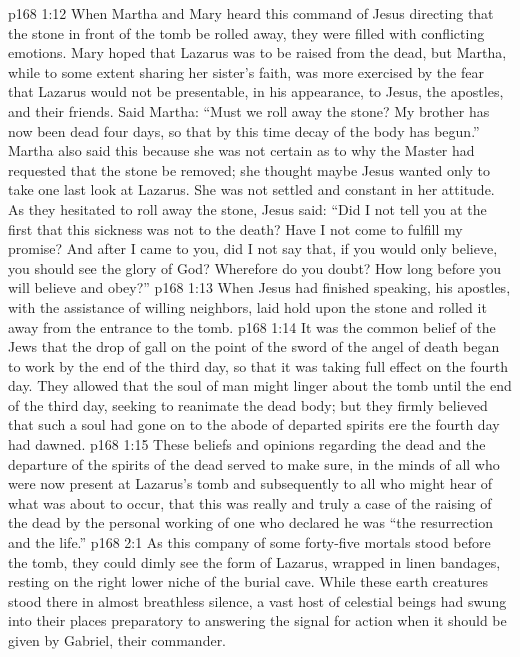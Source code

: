 \vs p168 1:12 When Martha and Mary heard this command of Jesus directing that the stone in front of the tomb be rolled away, they were filled with conflicting emotions. Mary hoped that Lazarus was to be raised from the dead, but Martha, while to some extent sharing her sister’s faith, was more exercised by the fear that Lazarus would not be presentable, in his appearance, to Jesus, the apostles, and their friends. Said Martha: “Must we roll away the stone? My brother has now been dead four days, so that by this time decay of the body has begun.” Martha also said this because she was not certain as to why the Master had requested that the stone be removed; she thought maybe Jesus wanted only to take one last look at Lazarus. She was not settled and constant in her attitude. As they hesitated to roll away the stone, Jesus said: \textcolor{ubdarkred}{“Did I not tell you at the first that this sickness was not to the death? Have I not come to fulfill my promise? And after I came to you, did I not say that, if you would only believe, you should see the glory of God? Wherefore do you doubt? How long before you will believe and obey?”}
\vs p168 1:13 When Jesus had finished speaking, his apostles, with the assistance of willing neighbors, laid hold upon the stone and rolled it away from the entrance to the tomb.
\vs p168 1:14 \pc It was the common belief of the Jews that the drop of gall on the point of the sword of the angel of death began to work by the end of the third day, so that it was taking full effect on the fourth day. They allowed that the soul of man might linger about the tomb until the end of the third day, seeking to reanimate the dead body; but they firmly believed that such a soul had gone on to the abode of departed spirits ere the fourth day had dawned.
\vs p168 1:15 These beliefs and opinions regarding the dead and the departure of the spirits of the dead served to make sure, in the minds of all who were now present at Lazarus’s tomb and subsequently to all who might hear of what was about to occur, that this was really and truly a case of the raising of the dead by the personal working of one who declared he was \textcolor{ubdarkred}{“the resurrection and the life.”}
\vs p168 2:1 As this company of some forty\hyp{}five mortals stood before the tomb, they could dimly see the form of Lazarus, wrapped in linen bandages, resting on the right lower niche of the burial cave. While these earth creatures stood there in almost breathless silence, a vast host of celestial beings had swung into their places preparatory to answering the signal for action when it should be given by Gabriel, their commander.
